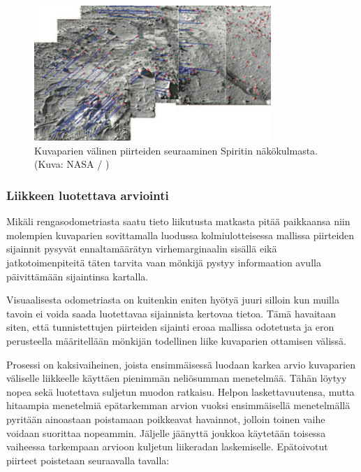 \documentclass[finnish]{tktltiki2}
\theoremstyle{definition}
\theoremstyle{remark}
\begin{document}
\begin{figure}[H]
	\caption{Kuvaparien välinen piirteiden seuraaminen Spiritin näkökulmasta. (Kuva: NASA / \cite{cheng2005visual})}
	\centering
		\includegraphics[width=0.8\textwidth]{feature_tracking}
\end{figure}

\subsubsection{Liikkeen luotettava arviointi}
Mikäli rengasodometriasta saatu tieto liikutusta matkasta pitää paikkaansa niin molempien kuvaparien sovittamalla luodussa kolmiulotteisessa mallissa piirteiden sijainnit pysyvät ennaltamäärätyn virhemarginaalin sisällä eikä jatkotoimenpiteitä täten tarvita vaan mönkijä pystyy informaation avulla päivittämään sijaintinsa kartalla. 

Visuaalisesta odometriasta on kuitenkin eniten hyötyä juuri silloin kun muilla tavoin ei voida saada luotettavaa sijainnista kertovaa tietoa. Tämä havaitaan siten, että tunnistettujen piirteiden sijainti eroaa mallissa odotetusta ja eron perusteella määritellään mönkijän todellinen liike kuvaparien ottamisen välissä.

Prosessi on kaksivaiheinen, joista ensimmäisessä luodaan karkea arvio kuvaparien väliselle liikkeelle käyttäen pienimmän neliösumman menetelmää. Tähän löytyy nopea sekä luotettava suljetun muodon ratkaisu. Helpon laskettavuutensa, mutta hitaampia menetelmiä epätarkemman arvion vuoksi ensimmäisellä menetelmällä pyritään ainoastaan poistamaan poikkeavat havainnot, jolloin toinen vaihe voidaan suorittaa nopeammin. Jäljelle jäänyttä joukkoa käytetään toisessa vaiheessa tarkempaan arvioon kuljetun liikeradan laskemiselle. Epätoivotut piirteet poistetaan seuraavalla tavalla:
\end{document}
